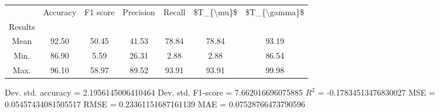 \begin{tabular}{|c|c|c|c|c|c|c|}
\toprule
{} &  Accuracy &  F1 score &  Precision &  Recall &  \$T\_\{\textbackslash mu\}\$ &  \$T\_\{\textbackslash gamma\}\$ \\
Results &           &           &            &         &            &               \\
\hline
Mean    &     92.50 &     50.45 &      41.53 &   78.84 &      78.84 &         93.19 \\
Min.    &     86.90 &      5.59 &      26.31 &    2.88 &       2.88 &         86.54 \\
Max.    &     96.10 &     58.97 &      89.52 &   93.91 &      93.91 &         99.98 \\
\bottomrule
\end{tabular}

 Dev. std. accuracy = 2.1956145006410464
 Dev. std. F1-score = 7.662016696075885
 $R^2$ = -0.17834513476830027
 MSE = 0.05457434081505517
 RMSE = 0.23361151687161139
 MAE = 0.07528766473790596